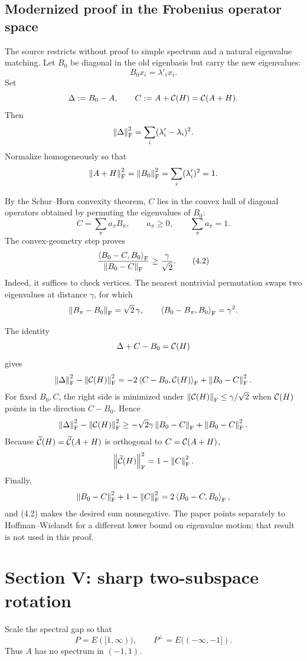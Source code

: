 \subsection{Modernized proof in the Frobenius operator space}

The source restricts without proof to simple spectrum and a natural eigenvalue matching. Let $B_0$ be diagonal in the old eigenbasis but carry the new eigenvalues:
\[
  B_0x_i=\lambda'_ix_i.
\]
Set
\[
  \Delta:=B_0-A,
  \qquad
  C:=A+\mathcal{C}(H)=\mathcal{C}(A+H).
\]
Then
\[
  \left\lVert \Delta\right\rVert_{\mathrm{F}}^2=\sum_i(\lambda'_i-\lambda_i)^2.
\]
Normalize homogeneously so that
\[
  \left\lVert A+H\right\rVert_{\mathrm{F}}^2=\left\lVert B_0\right\rVert_{\mathrm{F}}^2
  =\sum_i(\lambda'_i)^2=1.
\]

By the Schur--Horn convexity theorem, $C$ lies in the convex hull of diagonal operators obtained by permuting the eigenvalues of $B_0$:
\[
  C=\sum_{\pi}a_\pi B_\pi,
  \qquad a_\pi\ge0,
  \qquad\sum_\pi a_\pi=1.
\]
The convex-geometry step proves
\begin{equation}
  \frac{\left\langle B_0-C,B_0\right\rangle_{\mathrm{F}}}
       {\left\lVert B_0-C\right\rVert_{\mathrm{F}}}
  \ge\frac{\gamma}{\sqrt2}. \tag{4.2}
\end{equation}
Indeed, it suffices to check vertices. The nearest nontrivial permutation swaps two eigenvalues at distance $\gamma$, for which
\[
  \left\lVert B_\pi-B_0\right\rVert_{\mathrm{F}}=\sqrt2\,\gamma,
  \qquad
  \left\langle B_0-B_\pi,B_0\right\rangle_{\mathrm{F}}=\gamma^2.
\]

The identity
\[
  \Delta+C-B_0=\mathcal{C}(H)
\]
gives
\[
  \left\lVert \Delta\right\rVert_{\mathrm{F}}^2-
  \left\lVert \mathcal{C}(H)\right\rVert_{\mathrm{F}}^2
  =-2\left\langle C-B_0,\mathcal{C}(H)\right\rangle_{\mathrm{F}}
   +\left\lVert B_0-C\right\rVert_{\mathrm{F}}^2.
\]
For fixed $B_0,C$, the right side is minimized under
$\left\lVert \mathcal{C}(H)\right\rVert_{\mathrm{F}}\le\gamma/\sqrt2$ when $\mathcal{C}(H)$ points in the direction $C-B_0$. Hence
\[
  \left\lVert \Delta\right\rVert_{\mathrm{F}}^2-
  \left\lVert \mathcal{C}(H)\right\rVert_{\mathrm{F}}^2
  \ge
  -\sqrt2\gamma\left\lVert B_0-C\right\rVert_{\mathrm{F}}
  +\left\lVert B_0-C\right\rVert_{\mathrm{F}}^2.
\]
Because $\widetilde{\mathcal{C}}(H)=\widetilde{\mathcal{C}}(A+H)$ is orthogonal to $C=\mathcal{C}(A+H)$,
\[
  \left\lVert \widetilde{\mathcal{C}}(H)\right\rVert_{\mathrm{F}}^2
  =1-\left\lVert C\right\rVert_{\mathrm{F}}^2.
\]
Finally,
\[
  \left\lVert B_0-C\right\rVert_{\mathrm{F}}^2+1-\left\lVert C\right\rVert_{\mathrm{F}}^2
  =2\left\langle B_0-C,B_0\right\rangle_{\mathrm{F}},
\]
and (4.2) makes the desired sum nonnegative. The paper points separately to Hoffman--Wielandt for a different lower bound on eigenvalue motion; that result is not used in this proof.

\section{Section V: sharp two-subspace rotation}

Scale the spectral gap so that
\[
  P=E([1,\infty)),
  \qquad
  P^{\perp}=E(( -\infty,-1]).
\]
Thus $A$ has no spectrum in $(-1,1)$.

